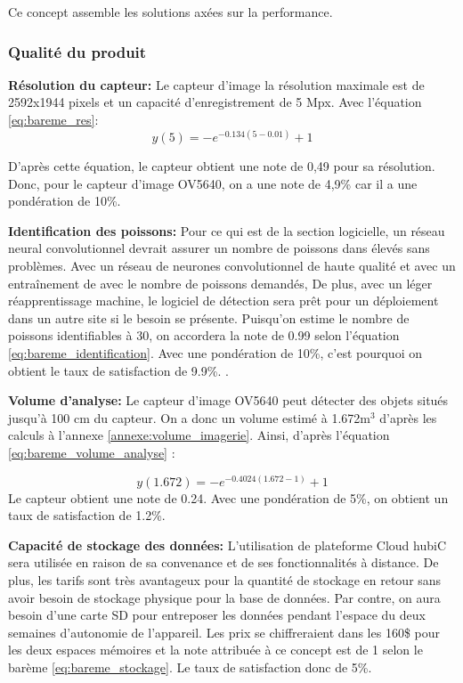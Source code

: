 Ce concept assemble les solutions axées sur la performance.

\subsubsection{Qualité du produit}

\textbf{Résolution du capteur:}
Le capteur d'image la résolution maximale est de 2592x1944 pixels et un capacité d'enregistrement de 5 Mpx. Avec l'équation \ref{eq:bareme_res}:
\begin{equation}
    y(5) = - e^{-0.134(5-0.01)}+1
\end{equation}

D'après cette équation, le capteur obtient une note de 0,49 pour sa résolution. Donc, pour le capteur d'image OV5640, on a une note de 4,9\% car il a une pondération de 10\%.
\vspace{5mm}


\textbf{Identification des poissons:}
Pour ce qui est de la section logicielle, un réseau neural convolutionnel devrait assurer un nombre de poissons dans élevés sans problèmes. Avec un réseau de neurones convolutionnel de haute qualité et avec un entraînement de avec le nombre de poissons demandés,  De plus, avec un léger réapprentissage machine, le logiciel de détection sera prêt pour un déploiement dans un autre site si le besoin se présente. Puisqu'on estime le nombre de poissons identifiables à 30, on accordera la note de 0.99 selon l’équation \ref{eq:bareme_identification}. Avec une pondération de 10\%, c’est pourquoi on obtient le taux de satisfaction de 9.9\%. \cite{neural_yt}.
\vspace{5mm}


\textbf{Volume d'analyse:}
Le capteur d'image OV5640 peut détecter des objets situés jusqu'à 100 cm du capteur. On a donc un volume estimé à 1.672m$^3$ d'après les calculs à l'annexe \ref{annexe:volume_imagerie}. Ainsi, d'après l'équation \ref{eq:bareme_volume_analyse} :

\begin{equation}
y(1.672) =-e^{-0.4024(1.672-1)}+1 
\end{equation}
Le capteur obtient une note de 0.24. Avec une pondération de 5\%, on obtient un taux de satisfaction de 1.2\%.


\vspace{5mm}

\textbf{Capacité de stockage des données:}
L’utilisation de plateforme Cloud hubiC sera utilisée en raison de sa convenance et de ses fonctionnalités à distance. De plus, les tarifs sont très avantageux pour la quantité de stockage en retour sans avoir besoin de stockage physique pour la base de données. Par contre, on aura besoin d’une carte SD pour entreposer les données pendant l’espace du deux semaines d’autonomie de l’appareil. Les prix se chiffreraient dans les 160\$ pour les deux espaces mémoires et la note attribuée à ce concept est de 1 selon le barème \ref{eq:bareme_stockage}. Le taux de satisfaction donc de 5\%.
\vspace{5mm}


